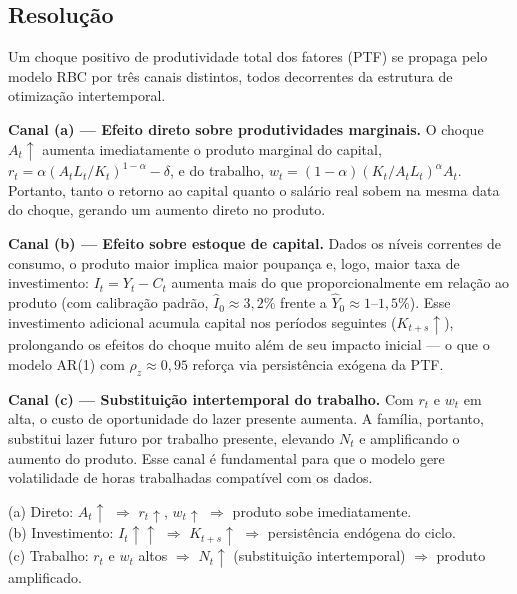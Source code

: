 \documentclass[12pt, a4paper]{article}
\begin{document}
\subsection*{Resolução}

Um choque positivo de produtividade total dos fatores (PTF) se propaga pelo modelo RBC por três canais distintos, todos decorrentes da estrutura de otimização intertemporal.

\textbf{Canal (a) — Efeito direto sobre produtividades marginais.} O choque $A_t\uparrow$ aumenta imediatamente o produto marginal do capital, $r_t = \alpha(A_t L_t/K_t)^{1-\alpha} - \delta$, e do trabalho, $w_t = (1-\alpha)(K_t/A_t L_t)^\alpha A_t$. Portanto, tanto o retorno ao capital quanto o salário real sobem na mesma data do choque, gerando um aumento direto no produto.

\textbf{Canal (b) — Efeito sobre estoque de capital.} Dados os níveis correntes de consumo, o produto maior implica maior poupança e, logo, maior taxa de investimento: $I_t = Y_t - C_t$ aumenta mais do que proporcionalmente em relação ao produto (com calibração padrão, $\hat{I}_0 \approx 3{,}2\%$ frente a $\hat{Y}_0 \approx 1$--$1{,}5\%$). Esse investimento adicional acumula capital nos períodos seguintes ($K_{t+s}\uparrow$), prolongando os efeitos do choque muito além de seu impacto inicial --- o que o modelo AR(1) com $\rho_z \approx 0{,}95$ reforça via persistência exógena da PTF.

\textbf{Canal (c) — Substituição intertemporal do trabalho.} Com $r_t$ e $w_t$ em alta, o custo de oportunidade do lazer presente aumenta. A família, portanto, substitui lazer futuro por trabalho presente, elevando $N_t$ e amplificando o aumento do produto. Esse canal é fundamental para que o modelo gere volatilidade de horas trabalhadas compatível com os dados.

\begin{resultbox}[title={Três Canais de Transmissão do Choque PTF (Q8)}]
(a) Direto: $A_t\uparrow$ $\Rightarrow$ $r_t\uparrow$, $w_t\uparrow$ $\Rightarrow$ produto sobe imediatamente.\\
(b) Investimento: $I_t\uparrow\uparrow$ $\Rightarrow$ $K_{t+s}\uparrow$ $\Rightarrow$ persistência endógena do ciclo.\\
(c) Trabalho: $r_t$ e $w_t$ altos $\Rightarrow$ $N_t\uparrow$ (substituição intertemporal) $\Rightarrow$ produto amplificado.
\end{resultbox}

\newpage
\end{document}
